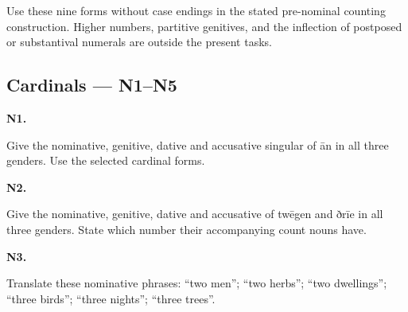 Use these nine forms without case endings in the stated pre-nominal counting construction. Higher numbers, partitive genitives, and the inflection of postposed or substantival numerals are outside the present tasks.

\subsection*{Cardinals — N1–N5}

\par\begin{minipage}{\linewidth}\raggedright
\textbf{N1.}

Give the nominative, genitive, dative and accusative singular of ān in all three genders. Use the selected cardinal forms.

\end{minipage}\par\addvspace{4pt}

\par\begin{minipage}{\linewidth}\raggedright
\textbf{N2.}

Give the nominative, genitive, dative and accusative of twēgen and ðrīe in all three genders. State which number their accompanying count nouns have.

\end{minipage}\par\addvspace{4pt}

\par\begin{minipage}{\linewidth}\raggedright
\textbf{N3.}

Translate these nominative phrases: “two men”; “two herbs”; “two dwellings”; “three birds”; “three nights”; “three trees”.

\end{minipage}\par\addvspace{4pt}

